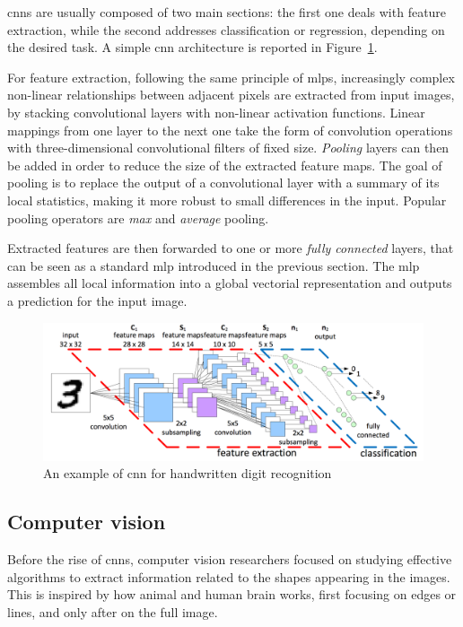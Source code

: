 \documentclass[%
    corpo=12pt,
    twoside,
    stile=classica,   
    tipotesi=magistrale,
    evenboxes,
    english,
	numerazioneromana,
]{toptesi}
\begin{document}
\bigskip
\Glspl{cnn} are usually composed of two main sections: the first one deals with feature extraction, while the second addresses classification or regression, depending on the desired task. A simple \gls{cnn} architecture is reported in Figure~\ref{fig:cnn}.

\medskip
For feature extraction, following the same principle of \glspl{mlp}, increasingly complex non-linear relationships between adjacent pixels are extracted from input images, by stacking convolutional layers with non-linear activation functions. Linear mappings from one layer to the next one take the form of convolution operations with three-dimensional convolutional filters of fixed size. \textit{Pooling} layers can then be added in order to reduce the size of the extracted feature maps. The goal of pooling is to replace the output of a convolutional layer with a summary of its local statistics, making it more robust to small differences in the input. Popular pooling operators are \textit{max} and \textit{average} pooling.

\medskip
Extracted features are then forwarded to one or more \textit{fully connected} layers, that can be seen as a standard \gls{mlp} introduced in the previous section. The \gls{mlp} assembles all local information into a global vectorial representation and outputs a prediction for the input image.

\begin{figure}
	\centering
	\includegraphics[width=.95\linewidth]{imgs/cnn.png}
	\caption{An example of \gls{cnn} for handwritten digit recognition}
	\label{fig:cnn}
\end{figure}

\subsection{Computer vision}
Before the rise of \glspl{cnn}, computer vision researchers focused on studying effective algorithms to extract information related to the shapes appearing in the images. This is inspired by how animal and human brain works, first focusing on edges or lines, and only after on the full image.
\end{document}
